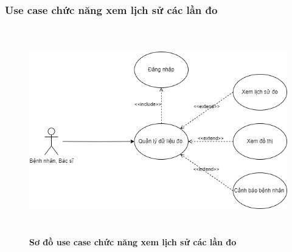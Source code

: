\subsubsection{Use case chức năng xem lịch sử các lần đo}
  \begin{figure}[H]
    \centering
    \includegraphics[width=15.2cm,height=9cm]{Images/use_case/use_case_view_history_record.png}
    \caption[Sơ đồ use case chức năng xem lịch sử các lần đo]{\bfseries \fontsize{12pt}{0pt}
    \selectfont Sơ đồ use case chức năng xem lịch sử các lần đo}
    \label{use_case_view_history_record} %
  \end{figure}

